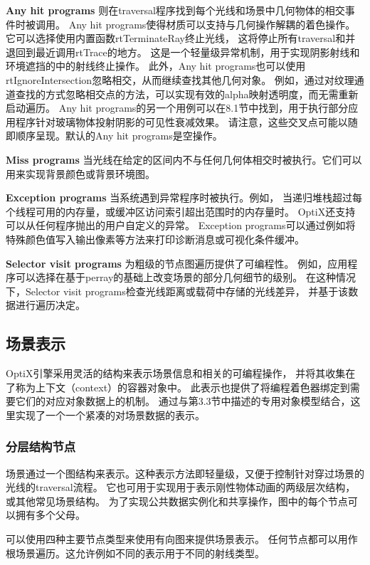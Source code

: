 \textbf{Any hit programs}
则在traversal程序找到每个光线和场景中几何物体的相交事件时被调用。
Any hit programs使得材质可以支持与几何操作解耦的着色操作。
它可以选择使用内置函数rtTerminateRay终止光线，
这将停止所有traversal和并退回到最近调用rtTrace的地方。
这是一个轻量级异常机制，用于实现阴影射线和环境遮挡的中的射线终止操作。
此外，Any hit programs也可以使用rtIgnoreIntersection忽略相交，从而继续查找其他几何对象。
例如，通过对纹理通道查找的方式忽略相交点的方法，可以实现有效的alpha映射透明度，而无需重新启动遍历。
Any hit programs的另一个用例可以在8.1节中找到，用于执行部分应用程序针对玻璃物体投射阴影的可见性衰减效果。
请注意，这些交叉点可能以随即顺序呈现。默认的Any hit programs是空操作。

\textbf{Miss programs}
当光线在给定的区间内不与任何几何体相交时被执行。它们可以用来实现背景颜色或背景环境图。

\textbf{Exception programs}
当系统遇到异常程序时被执行。例如，
当递归堆栈超过每个线程可用的内存量，或缓冲区访问索引超出范围时的内存量时。 
OptiX还支持可以从任何程序抛出的用户自定义的异常。
Exception programs可以通过例如将特殊颜色值写入输出像素等方法来打印诊断消息或可视化条件缓冲。

\textbf{Selector visit programs}
为粗级的节点图遍历提供了可编程性。
例如，应用程序可以选择在基于perray的基础上改变场景的部分几何细节的级别。 
在这种情况下，Selector visit programs检查光线距离或载荷中存储的光线差异，
并基于该数据进行遍历决定。

\subsection{场景表示}

OptiX引擎采用灵活的结构来表示场景信息和相关的可编程操作，
并将其收集在了称为上下文（context）的容器对象中。
此表示也提供了将编程着色器绑定到需要它们的对应对象数据上的机制。
通过与第3.3节中描述的专用对象模型结合，这里实现了一个一个紧凑的对场景数据的表示。

\subsubsection{分层结构节点}

场景通过一个图结构来表示。这种表示方法即轻量级，又便于控制针对穿过场景的光线的traversal流程。
它也可用于实现用于表示刚性物体动画的两级层次结构，或其他常见场景结构。
为了实现公共数据实例化和共享操作，图中的每个节点可以拥有多个父母。

可以使用四种主要节点类型来使用有向图来提供场景表示。
任何节点都可以用作根场景遍历。这允许例如不同的表示用于不同的射线类型。

